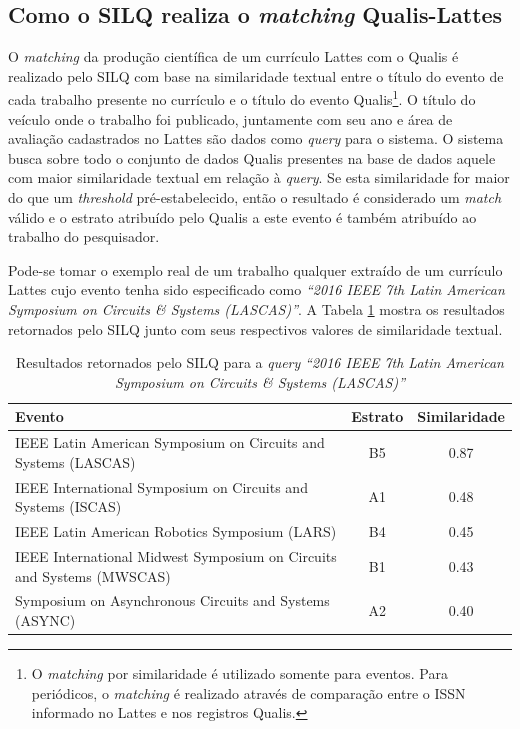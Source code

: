 \documentclass[12pt]{article}
\newcommand{\quotes}[1]{``#1''}
\begin{document}
\subsection{Como o SILQ realiza o \textit{matching} Qualis-Lattes} \label{sec:algoritmo-silq1}

O \textit{matching} da produção científica de um currículo Lattes com o Qualis é realizado pelo SILQ com base na similaridade textual entre o título do evento de cada trabalho presente no currículo e o título do evento Qualis\footnote{O \textit{matching} por similaridade é utilizado somente para eventos. Para periódicos, o \textit{matching} é realizado através de comparação entre o ISSN informado no Lattes e nos registros Qualis.}. O título do veículo onde o trabalho foi publicado, juntamente com seu ano e área de avaliação cadastrados no Lattes são dados como \textit{query} para o sistema. O sistema busca sobre todo o conjunto de dados Qualis presentes na base de dados aquele com maior similaridade textual em relação à \textit{query}. Se esta similaridade for maior do que um \textit{threshold} pré-estabelecido, então o resultado é considerado um \textit{match} válido e o estrato atribuído pelo Qualis a este evento é também atribuído ao trabalho do pesquisador.

Pode-se tomar o exemplo real de um trabalho qualquer extraído de um currículo Lattes cujo evento tenha sido especificado como \textit{\quotes{2016 IEEE 7th Latin American Symposium on Circuits \& Systems (LASCAS)}}. A Tabela \ref{tab:exemplo-classificacao} mostra os resultados retornados pelo SILQ junto com seus respectivos valores de similaridade textual.

\begin{table}[!h]
\begin{center}
\caption{Resultados retornados pelo SILQ para a \textit{query} \textit{\quotes{2016 IEEE 7th Latin American Symposium on Circuits \& Systems (LASCAS)}}}\label{tab:exemplo-classificacao}
\begin{tabular}{ p{6cm} | c | c }
\hline
\textbf{Evento} & \textbf{Estrato} & \textbf{Similaridade} \\ \hline
IEEE Latin American Symposium on Circuits and Systems (LASCAS) & B5 & 0.87 \\ \hline
IEEE International Symposium on Circuits and Systems (ISCAS) & A1 & 0.48 \\ \hline
IEEE Latin American Robotics Symposium (LARS) & B4 & 0.45 \\ \hline
IEEE International Midwest Symposium on Circuits and Systems (MWSCAS) & B1 & 0.43 \\ \hline
Symposium on Asynchronous Circuits and Systems (ASYNC) & A2 & 0.40 \\ \hline
\end{tabular}
\end{center}
\end{table}
\end{document}
